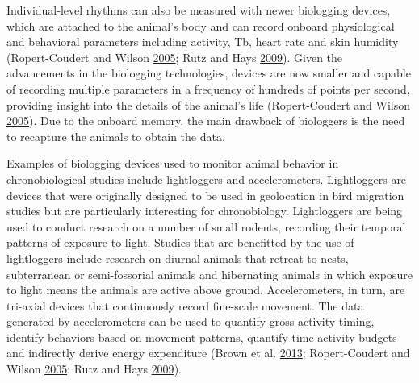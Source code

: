\documentclass[msc,numbers,hidelinks]{coppe}
\begin{document}
  Individual-level rhythms can also be measured with newer biologging devices, which are attached to the animal's body and can record onboard physiological and behavioral parameters including activity, Tb, heart rate and skin humidity (Ropert-Coudert and Wilson \protect\hyperlink{ref-ropert-coudertTrendsPerspectivesAnimalattached2005}{2005}; Rutz and Hays \protect\hyperlink{ref-rutzNewFrontiersBiologging2009}{2009}). Given the advancements in the biologging technologies, devices are now smaller and capable of recording multiple parameters in a frequency of hundreds of points per second, providing insight into the details of the animal's life (Ropert-Coudert and Wilson \protect\hyperlink{ref-ropert-coudertTrendsPerspectivesAnimalattached2005}{2005}). Due to the onboard memory, the main drawback of biologgers is the need to recapture the animals to obtain the data.

  Examples of biologging devices used to monitor animal behavior in chronobiological studies include lightloggers and accelerometers. Lightloggers are devices that were originally designed to be used in geolocation in bird migration studies but are particularly interesting for chronobiology. Lightloggers are being used to conduct research on a number of small rodents, recording their temporal patterns of exposure to light. Studies that are benefitted by the use of lightloggers include research on diurnal animals that retreat to nests, subterranean or semi-fossorial animals and hibernating animals in which exposure to light means the animals are active above ground. Accelerometers, in turn, are tri-axial devices that continuously record fine-scale movement. The data generated by accelerometers can be used to quantify gross activity timing, identify behaviors based on movement patterns, quantify time-activity budgets and indirectly derive energy expenditure (Brown et al. \protect\hyperlink{ref-brownObservingUnwatchableAcceleration2013}{2013}; Ropert-Coudert and Wilson \protect\hyperlink{ref-ropert-coudertTrendsPerspectivesAnimalattached2005}{2005}; Rutz and Hays \protect\hyperlink{ref-rutzNewFrontiersBiologging2009}{2009}).
\end{document}
